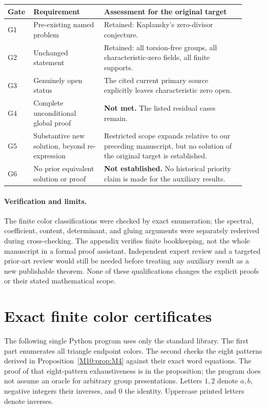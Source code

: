 \documentclass[11pt,a4paper,oneside]{report}
\theoremstyle{definition}
\theoremstyle{remark}
\begin{document}
\begin{center}\small
\begin{tabular}{@{}>{\raggedright\arraybackslash}p{0.07\linewidth}>{\raggedright\arraybackslash}p{0.29\linewidth}>{\raggedright\arraybackslash}p{0.56\linewidth}@{}}
\toprule
Gate & Requirement & Assessment for the original target\\
\midrule
G1 & Pre-existing named problem & Retained: Kaplansky's zero-divisor conjecture.\\
G2 & Unchanged statement & Retained: all torsion-free groups, all characteristic-zero fields, all finite supports.\\
G3 & Genuinely open status & The cited current primary source explicitly leaves characteristic zero open.\\
G4 & Complete unconditional global proof & \textbf{Not met.} The listed residual cases remain.\\
G5 & Substantive new solution, beyond re-expression & Restricted scope expands relative to our preceding manuscript, but no solution of the original target is established.\\
G6 & No prior equivalent solution or proof & \textbf{Not established.} No historical priority claim is made for the auxiliary results.\\
\bottomrule
\end{tabular}
\end{center}

\paragraph{Verification and limits.}
The finite color classifications were checked by exact enumeration;
the spectral, coefficient, content, determinant, and gluing arguments
were separately rederived during cross-checking. The appendix verifies
finite bookkeeping, not the whole manuscript in a formal proof
assistant. Independent expert review and a targeted prior-art review
would still be needed before treating any auxiliary result as a new
publishable theorem. None of these qualifications changes the explicit
proofs or their stated mathematical scope.

\clearpage

\section{Exact finite color certificates}\label{M10:app:certificate}
The following single Python program uses only the standard library.
The first part enumerates all triangle endpoint colors. The second
checks the eight patterns derived in Proposition~\ref{M10:prop:M4}
against their exact word equations. The proof of that eight-pattern
exhaustiveness is in the proposition; the program does not assume
an oracle for arbitrary group presentations.
Letters $1,2$ denote $a,b$, negative integers their inverses,
and $0$ the identity. Uppercase printed letters denote inverses.
\end{document}

